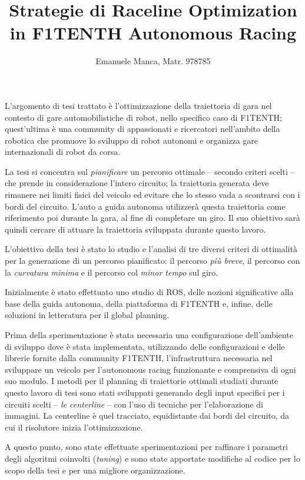 \documentclass[12pt,a4paper]{article}
\title{\textbf{Strategie di Raceline Optimization\\in F1TENTH Autonomous Racing}}
\author{Emanuele Manca, Matr. 978785}
\date{}
\begin{document}
\maketitle
\noindent L'argomento di tesi trattato è l'ottimizzazione della traiettoria di gara nel contesto di gare
automobilistiche di robot, nello specifico caso di F1TENTH; quest'ultima è una community di appassionati
e ricercatori nell'ambito della robotica che promuove lo sviluppo di robot autonomi e organizza gare
internazionali di robot da corsa.

La tesi si concentra sul \textit{pianificare} un percorso ottimale -- secondo criteri scelti -- che
prende in considerazione l'intero circuito; la traiettoria generata deve rimanere nei limiti fisici del
veicolo ed evitare che lo stesso vada a scontrarsi con i bordi del circuito. L'auto a guida autonoma
utilizzerà questa traiettoria come riferimento poi durante la gara, al fine di completare un giro. Il suo
obiettivo sarà quindi cercare di attuare la traiettoria sviluppata durante questo lavoro.

\bigskip
\noindent L'obiettivo della tesi è stato lo studio e l'analisi di tre diversi criteri di ottimalità per
la generazione di un percorso pianificato: il percorso \textit{più breve}, il percorso con la
\textit{curvatura minima} e il percorso col \textit{minor tempo} sul giro.

Inizialmente è stato effettuato uno studio di ROS, delle nozioni significative alla base della guida
autonoma, della piattaforma di F1TENTH e, infine, delle soluzioni in letteratura per il global
planning.

Prima della sperimentazione è stata necessaria una configurazione dell'ambiente di sviluppo dove è stata
implementata, utilizzando delle configurazioni e delle librerie fornite dalla community F1TENTH,
l'infrastruttura necessaria nel sviluppare un veicolo per l'autonomous racing funzionante e comprensiva
di ogni suo modulo. I metodi per il planning di traiettorie ottimali studiati durante questo lavoro di
tesi sono stati sviluppati generando degli input specifici per i circuiti scelti -- \textit{le
centerline} -- con l'uso di tecniche per l'elaborazione di immagini. La centerline è quel tracciato,
equidistante dai bordi del circuito, da cui il risolutore inizia l'ottimizzazione. 

A questo punto, sono state effettuate sperimentazioni per raffinare i parametri degli algoritmi coinvolti
(\textit{tuning}) e sono state apportate modifiche al codice per lo scopo della tesi e per una migliore
organizzazione.
\end{document}
